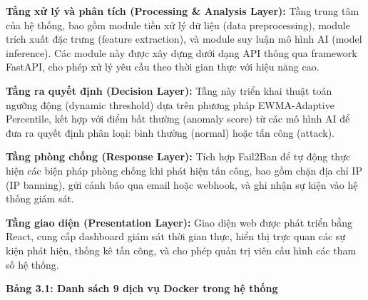\documentclass[
  a4paper]{report}
\begin{document}
\textbf{Tầng xử lý và phân tích (Processing \& Analysis Layer):} Tầng
trung tâm của hệ thống, bao gồm module tiền xử lý dữ liệu (data
preprocessing), module trích xuất đặc trưng (feature extraction), và
module suy luận mô hình AI (model inference). Các module này được xây
dựng dưới dạng API thông qua framework FastAPI, cho phép xử lý yêu cầu
theo thời gian thực với hiệu năng cao.

\textbf{Tầng ra quyết định (Decision Layer):} Tầng này triển khai thuật
toán ngưỡng động (dynamic threshold) dựa trên phương pháp EWMA-Adaptive
Percentile, kết hợp với điểm bất thường (anomaly score) từ các mô hình
AI để đưa ra quyết định phân loại: bình thường (normal) hoặc tấn công
(attack).

\textbf{Tầng phòng chống (Response Layer):} Tích hợp Fail2Ban để tự động
thực hiện các biện pháp phòng chống khi phát hiện tấn công, bao gồm chặn
địa chỉ IP (IP banning), gửi cảnh báo qua email hoặc webhook, và ghi
nhận sự kiện vào hệ thống giám sát.

\textbf{Tầng giao diện (Presentation Layer):} Giao diện web được phát
triển bằng React, cung cấp dashboard giám sát thời gian thực, hiển thị
trực quan các sự kiện phát hiện, thống kê tấn công, và cho phép quản trị
viên cấu hình các tham số hệ thống.

\textbf{Bảng 3.1: Danh sách 9 dịch vụ Docker trong hệ thống}
\end{document}
